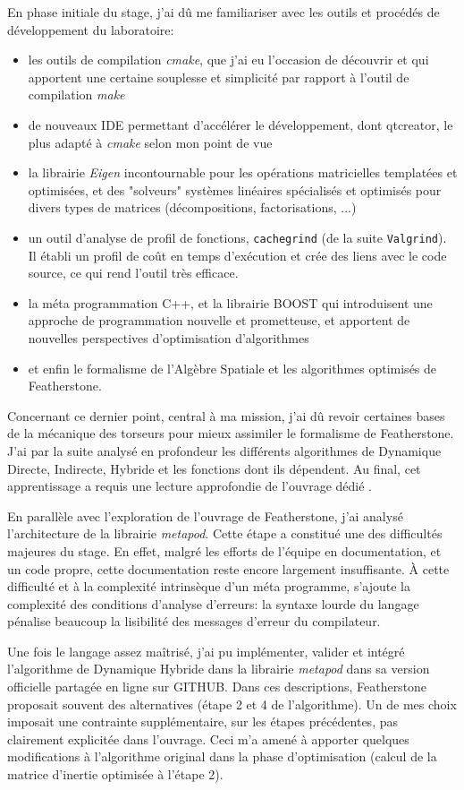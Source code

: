 \documentclass{report}
\begin{document}
En phase initiale du stage, j'ai dû me familiariser avec les outils et procédés de développement du laboratoire:
\begin{itemize}
\item les outils de compilation \emph{cmake}, que j'ai eu l'occasion de découvrir et qui apportent une certaine souplesse et simplicité par rapport à l'outil de compilation \emph{make}
\item de nouveaux IDE permettant d'accélérer le développement, dont qtcreator, le plus adapté à \emph{cmake} selon mon point de vue
\item la librairie \emph{Eigen} incontournable pour les opérations matricielles templatées et optimisées, et des "solveurs" systèmes linéaires spécialisés et optimisés pour divers types de matrices (décompositions, factorisations, ...)
\item un outil d'analyse de profil de fonctions, \verb;cachegrind; (de la suite \verb;Valgrind;). Il établi un profil de coût en temps d'exécution et crée des liens avec le code source, ce qui rend l'outil très efficace.
\item la méta programmation C++, et la librairie BOOST qui introduisent une approche de programmation nouvelle et prometteuse, et apportent de nouvelles perspectives d'optimisation d'algorithmes
\item et enfin le formalisme de l'Algèbre Spatiale et les algorithmes optimisés de Featherstone.
\end{itemize}
Concernant ce dernier point, central à ma mission, j'ai dû revoir certaines bases de la mécanique des torseurs pour mieux assimiler le formalisme de Featherstone. J'ai par la suite analysé en profondeur les différents algorithmes de Dynamique Directe, Indirecte, Hybride et les fonctions dont ils dépendent. Au final, cet apprentissage a requis une lecture approfondie de l'ouvrage dédié \cite{bib_featherstone}.

En parallèle avec l'exploration de l'ouvrage de Featherstone, j'ai analysé l'architecture de la librairie \emph{metapod}. Cette étape a constitué une des difficultés majeures du stage. En effet, malgré les efforts de l'équipe en documentation, et un code propre, cette documentation reste encore largement insuffisante. \`{A} cette difficulté et à la complexité intrinsèque d'un méta programme, s'ajoute la complexité des conditions d'analyse d'erreurs: la syntaxe lourde du langage pénalise beaucoup la lisibilité des messages d'erreur du compilateur.

Une fois le langage assez maîtrisé, j'ai pu implémenter, valider et intégré l'algorithme de Dynamique Hybride dans la librairie \emph{metapod} dans sa version officielle partagée en ligne sur GITHUB. Dans ces descriptions, Featherstone proposait souvent des alternatives (étape 2 et 4 de l'algorithme). Un de mes choix imposait une contrainte supplémentaire, sur les étapes précédentes, pas clairement explicitée dans l'ouvrage. Ceci m'a amené à apporter quelques modifications à l'algorithme original dans la phase d'optimisation (calcul de la matrice d'inertie optimisée à l'étape 2).
\end{document}
